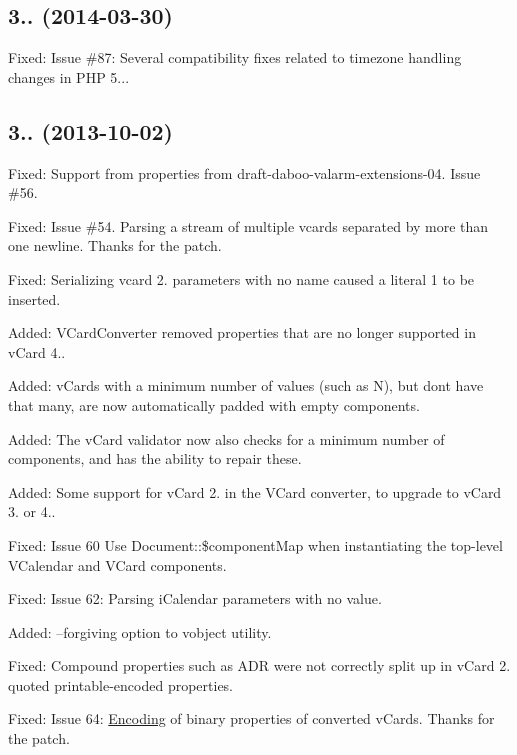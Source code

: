 \subsection*{3.. (2014-\/03-\/30) }


\begin{DoxyItemize}
\item Fixed\+: Issue \#87\+: Several compatibility fixes related to timezone handling changes in P\+HP 5...
\end{DoxyItemize}

\subsection*{3.. (2013-\/10-\/02) }


\begin{DoxyItemize}
\item Fixed\+: Support from properties from draft-\/daboo-\/valarm-\/extensions-\/04. Issue \#56.
\item Fixed\+: Issue \#54. Parsing a stream of multiple vcards separated by more than one newline. Thanks  for the patch.
\item Fixed\+: Serializing vcard 2. parameters with no name caused a literal \textquotesingle{}1\textquotesingle{} to be inserted.
\item Added\+: V\+Card\+Converter removed properties that are no longer supported in v\+Card 4..
\item Added\+: v\+Cards with a minimum number of values (such as N), but don\textquotesingle{}t have that many, are now automatically padded with empty components.
\item Added\+: The v\+Card validator now also checks for a minimum number of components, and has the ability to repair these.
\item Added\+: Some support for v\+Card 2. in the V\+Card converter, to upgrade to v\+Card 3. or 4..
\item Fixed\+: Issue 60 Use Document\+::\$component\+Map when instantiating the top-\/level V\+Calendar and V\+Card components.
\item Fixed\+: Issue 62\+: Parsing i\+Calendar parameters with no value.
\item Added\+: --forgiving option to vobject utility.
\item Fixed\+: Compound properties such as A\+DR were not correctly split up in v\+Card 2. quoted printable-\/encoded properties.
\item Fixed\+: Issue 64\+: \mbox{\hyperlink{class_encoding}{Encoding}} of binary properties of converted v\+Cards. Thanks  for the patch.
\end{DoxyItemize}

